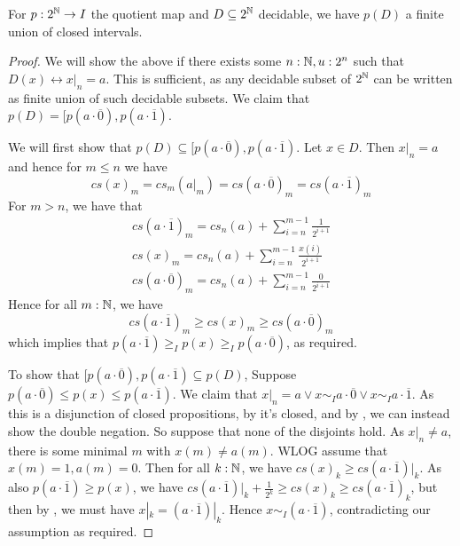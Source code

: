 \begin{lemma}
  For $p:2^{\mathbb{N}} \to I$ the quotient map and $D\subseteq 2^{\mathbb{N}}$ decidable, we have $p(D)$ a finite union of closed intervals. 
\end{lemma}
\begin{proof}
  We will show the above if there exists some $n:\mathbb{N}, u:2^n$ such that $D(x) \leftrightarrow x|_n = a$.
  This is sufficient, as any decidable subset of $2^{\mathbb{N}}$ can be written as finite union of such decidable subsets. 
  We claim that $p(D) = [p(a\cdot \overline 0) , p(a \cdot \overline 1)$. 
\item 
  We will first show that $p(D) \subseteq [p(a\cdot \overline 0) , p(a \cdot \overline 1)$. 
  Let $x\in D$. 
  Then $x|_n = a$ and hence for $m\leq n$ we have 
  \begin{equation}
    cs(x)_m = cs_m(a|_m) = cs(a\cdot \overline 0)_m= cs(a\cdot \overline 1)_m
  \end{equation}
  For $m>n$, we have that 
  \begin{align}
    cs(a\cdot \overline 1)_m =
    cs_n(a) +\sum_{i = n} ^{m-1} \frac{1}{2^{i+1}}
    \\
    cs(x)_m =
    cs_n(a) +\sum_{i = n} ^{m-1} \frac{x(i)}{2^{i+1}}
    \\
    cs(a\cdot \overline 0)_m = 
    cs_n(a) +\sum_{i = n} ^{m-1} \frac{0}{2^{i+1}}
  \end{align} 
  Hence for all $m:\mathbb{N}$, we have 
  \begin{equation}
    cs(a\cdot \overline 1)_m \geq 
    cs(x)_m \geq 
    cs(a\cdot\overline 0)_m
  \end{equation}
 which implies that $p(a\cdot \overline 1) \geq_I p(x) \geq_I p(a\cdot\overline 0)$, as required. 
\item 
  To show that $[p(a\cdot \overline 0) , p(a \cdot \overline 1)\subseteq p(D)$, 
  Suppose
  $p(a\cdot \overline 0) \leq p(x) \leq p(a \cdot \overline 1)$. 
  We claim that 
  $x|_n = a \vee x \sim_I a \cdot \overline 0 \vee x \sim_I a \cdot \overline 1$. 
  As this is a disjunction of closed propositions, by  it's closed, and by 
  , we can instead show the double negation. 
  So suppose that none of the disjoints hold. 
  As $x|_n \neq a$, there is some minimal $m$ with $x(m) \neq a(m)$. 
  WLOG assume that $x(m) = 1, a(m) = 0$. 
  Then for all $k:\mathbb{N}$, we have 
  $cs(x)_k \geq cs(a \cdot \overline 1)|_k$. 
  As also 
  $p(a\cdot \overline 1)\geq p(x)$, we have 
  $cs(a \cdot \overline 1)|_k + \frac{1}{2^k} \geq cs(x)_k \geq cs(a\cdot \overline 1)_k$, 
  but then by , we must have $x|_k = (a\cdot \overline 1)|_k$. 
  Hence $x\sim_I (a\cdot\overline 1)$, contradicting our assumption as required. 
\end{proof}

